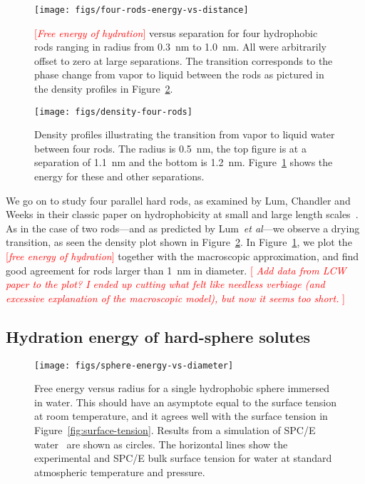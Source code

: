 \documentclass[letterpaper,twocolumn,amsmath,amssymb,prb]{revtex4-1}
\newcommand{\fixme}[1]{\textcolor{red}{[\emph{#1}]}}
\begin{document}
\begin{figure}
\begin{center}
\texttt{[image: figs/four-rods-energy-vs-distance]}
\end{center}
\caption{ \fixme{Free energy of hydration} 
versus separation for four hydrophobic rods ranging in radius from
0.3~nm to 1.0~nm.
All were arbitrarily offset to zero at large separations. The
transition corresponds to the phase change from
vapor to liquid between the rods as pictured in the density profiles in 
Figure~\ref{fig:density-four-rods}. }
\label{fig:four-rods-energy-vs-distance}
\end{figure}

\begin{figure}
\begin{center}
\texttt{[image: figs/density-four-rods]}
\end{center}
\caption{ Density profiles illustrating the transition from vapor 
to liquid water between four rods. The radius is 0.5~nm, the top figure is 
at a separation of 1.1~nm and the
bottom is 1.2~nm. Figure~\ref{fig:four-rods-energy-vs-distance} shows
the energy for these and other separations.}

\label{fig:density-four-rods}
\end{figure}

We go on to study four parallel hard rods, as examined by Lum,
Chandler and Weeks in their classic paper on hydrophobicity at small
and large length scales~\cite{lum1999hydrophobicity}.  As in the case
of two rods---and as predicted by Lum~\emph{et al}---we observe a
drying transition, as seen the density plot shown in
Figure~\ref{fig:density-four-rods}.  In
Figure~\ref{fig:four-rods-energy-vs-distance}, we plot the \fixme{free energy
of hydration} together with the macroscopic approximation, and find
good agreement for rods larger than 1~nm in diameter.  \fixme{ Add
  data from LCW paper to the plot? I ended up cutting what felt like
  needless verbiage (and excessive explanation of the macroscopic
  model), but now it seems too short. }

\subsection{Hydration energy of hard-sphere solutes}

\begin{figure}
\begin{center}
\texttt{[image: figs/sphere-energy-vs-diameter]}
\end{center}
\caption{ Free energy versus radius for a single hydrophobic sphere
  immersed in water. This should have an asymptote equal to the
  surface tension at room temperature, and it agrees well with the
  surface tension in Figure~\ref{fig:surface-tension}. Results from a
  simulation of SPC/E water~\cite{huang2001shs} are shown as circles.
  The horizontal lines show the experimental and SPC/E bulk surface
  tension for water at standard atmospheric temperature and
  pressure. }
\label{fig:sphere-energy-vs-diameter}
\end{figure}
\end{document}
